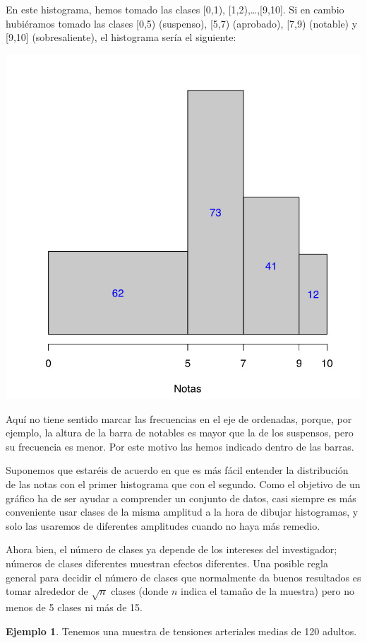 \documentclass[
]{book}
\theoremstyle{definition}
\theoremstyle{definition}
\newtheorem{example}{Ejemplo}[chapter]
\theoremstyle{definition}
\theoremstyle{definition}
\theoremstyle{remark}
\begin{document}
En este histograma, hemos tomado las clases {[}0,1), {[}1,2),\ldots,{[}9,10{]}. Si en cambio hubiéramos tomado las clases {[}0,5) (suspenso), {[}5,7) (aprobado), {[}7,9) (notable) y {[}9,10{]} (sobresaliente), el histograma sería el siguiente:

\begin{center}\includegraphics[width=0.6\linewidth]{INREMDN_files/figure-html/histnotas2} \end{center}

Aquí no tiene sentido marcar las frecuencias en el eje de ordenadas, porque, por ejemplo, la altura de la barra de notables es mayor que la de los suspensos, pero su frecuencia es menor. Por este motivo las hemos indicado dentro de las barras.

Suponemos que estaréis de acuerdo en que es más fácil entender la distribución de las notas con el primer histograma que con el segundo. Como el objetivo de un gráfico ha de ser ayudar a comprender un conjunto de datos, casi siempre es más conveniente usar clases de la misma amplitud a la hora de dibujar histogramas, y solo las usaremos de diferentes amplitudes cuando no haya más remedio.

Ahora bien, el número de clases ya depende de los intereses del investigador; números de clases diferentes muestran efectos diferentes. Una posible regla general para decidir el número de clases que normalmente da buenos resultados es tomar alrededor de \(\sqrt{n}\) clases (donde \(n\) indica el tamaño de la muestra) pero no menos de 5 clases ni más de 15.

\begin{example}
\protect\hypertarget{exm:tensioagrup}{}\label{exm:tensioagrup}Tenemos una muestra de tensiones arteriales medias de 120 adultos.
\end{example}
\end{document}

